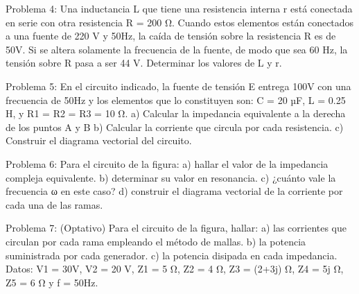 Problema 4:
Una inductancia L que tiene una resistencia interna r está conectada en serie con otra resistencia R = 200 Ω. Cuando estos elementos están conectados a una fuente de 220 V y 50Hz, la caída de tensión sobre la resistencia R es de 50V. Si se altera solamente la frecuencia de la fuente, de modo que sea 60 Hz, la tensión sobre R pasa a ser 44 V. Determinar los valores de L y r.



Problema 5:
En el circuito indicado, la fuente de tensión E entrega 100V con una frecuencia de 50Hz y los elementos que lo constituyen son:
C = 20 µF, L = 0.25 H, y R1 = R2 = R3 = 10 Ω.
a)	Calcular la impedancia equivalente a la derecha de los puntos A y B
b)	Calcular la corriente que circula por cada resistencia.
c)	Construir el diagrama vectorial del circuito.
 




Problema 6:
Para el circuito de la figura:
a)	hallar el valor de la impedancia compleja equivalente.
b)	determinar su valor en resonancia.
c)	¿cuánto vale la frecuencia ω en este caso?
d)	construir el diagrama vectorial de la corriente por cada una
de las ramas.



Problema 7: (Optativo)
Para el circuito de la figura, hallar:
a)	las	corrientes	que	circulan	por	cada	rama empleando el método de mallas.
b)	la potencia suministrada por cada generador.
c)	la potencia disipada en cada impedancia.
Datos: V1  = 30V, V2  = 20 V, Z1  = 5 Ω, Z2  = 4 Ω,  Z3  = (2+3j) Ω, Z4  = 5j Ω, Z5  = 6  Ω y f = 50Hz.

